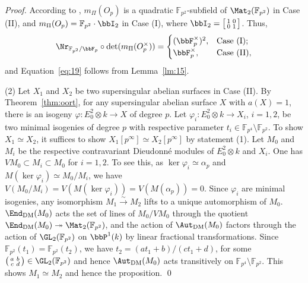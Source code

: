 \documentclass[]{amsart}
\theoremstyle{plain}
\theoremstyle{definition}
\theoremstyle{remark}
\def\Fp{{\bbF}_p}
\newcommand{\F}{\mathbb F}
\newcommand{\<}{\langle}   %
\renewcommand{\>}{\rangle} %
\newcommand{\isoto}{\stackrel{\sim}{\longrightarrow}}
\newcommand{\dieu}{Dieudonn\'{e} }
\def\onto{\twoheadrightarrow}
\begin{document}
\begin{proof}
    According to \cite[Proposition 3.2]{yu-yu:mass_surface}, $m_\Pi(O_p)$ is a quadratic $\F_{p^2}$-subfield of $\Mat_2(\F_{p^2})$ in Case (II), and $m_\Pi(O_p)=\F_{p^2} \cdot \bbI_2$ in Case (I), where $\bbI_2=\begin{bmatrix}  
    \begin{smallmatrix}
        1 & 0 \\
        0 & 1
    \end{smallmatrix}\end{bmatrix}$. Thus, 
    \[ \Nr_{\F_{p^2}/\Fp} \circ \det(m_\Pi(O_p^\times))= \begin{cases}
       (\Fp^\times)^2, & \text{Case (I)}; \\
       \Fp^\times, &  \text{Case (II)}, 
   \end{cases}\]
    and Equation~\eqref{eq:19} follows from Lemma~\ref{lm:15}. 

    (2) Let $X_1$ and $X_2$ be two supersingular abelian surfaces in Case (II). By Theorem~\ref{thm:oort}, for any supersingular abelian surface $X$ with $a(X)=1$, there is an isogeny $\varphi: E_0^2 \otimes k \to X$ of degree $p$.  Let $\varphi_i: E_0^2 \otimes k \to X_i$, $i=1,2$, be two minimal isogenies of degree $p$ with respective parameter $t_i\in \F_{p^4}\setminus \F_{p^2}$. 
    To show $X_1\simeq X_2$, it suffices to show $X_1[p^\infty]\simeq X_2[p^\infty]$ by statement (1). Let $M_0$ and $M_i$ be the respective contravariant \dieu modules of $E_0^2\otimes k$ and $X_i$. One has $VM_0\subset M_i \subset M_0$ for $i=1,2$. To see this, as $\ker \varphi_i\simeq \alpha_p$ and $M(\ker \varphi_i)\simeq M_0/M_i$, we have $V(M_0/M_i)=V(M(\ker \varphi_i))=V(M(\alpha_p))=0$. Since $\varphi_i$ are minimal isogenies, any isomorphism $M_1\isoto M_2$ lifts to a unique automorphism of $M_0$. $\End_{\rm DM}(M_0)$ acts the set of lines of $M_0/VM_0$ through the quotient $\End_{\rm DM}(M_0)\onto \Mat_2(\F_{p^2})$, and the action of $\Aut_{\rm DM}(M_0)$ factors through the action of $\GL_2(\F_{p^2})$ on $\bbP^1(k)$ by linear fractional transformations. 
    Since $\F_{p^2}(t_1)=\F_{p^2}(t_2)$, we have $t_2=(a t_1+b)/(c t_1+d)$, for some $\left (\begin{smallmatrix}
        a & b\\
        c & d 
    \end{smallmatrix} \right ) \in \GL_2(\F_{p^2}) $ and hence $\Aut_{\rm DM}(M_0)$ acts transitively on $\F_{p^4}\setminus \F_{p^2}$. This shows $M_1\simeq M_2$ and hence the proposition. \qed
\end{proof}
\end{document}
